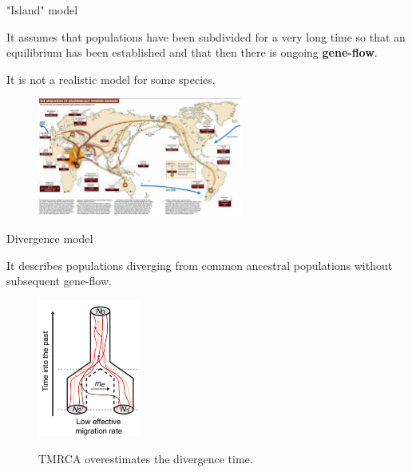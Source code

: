 \begin{frame}{"Island" model}

	\small
	\begin{block}{}
	It assumes that populations have been subdivided for a very long time so that 
	an equilibrium has been established and that then there is ongoing \textbf{gene-flow}.
	\end{block}
	It is not a realistic model for some species.

	\pause
	\begin{figure}
                \includegraphics[width=0.6\textwidth]{Pics/human_evo}
        \end{figure}


\end{frame}


\begin{frame}{Divergence model}

	\small
	\begin{block}{}
		It describes populations diverging from common ancestral populations without subsequent gene-flow.
	\end{block}

	\begin{figure}
                \includegraphics[width=0.3\textwidth]{Pics/coal_divergence} \
		\caption{\small TMRCA overestimates the divergence time.}
        \end{figure}

\end{frame}



